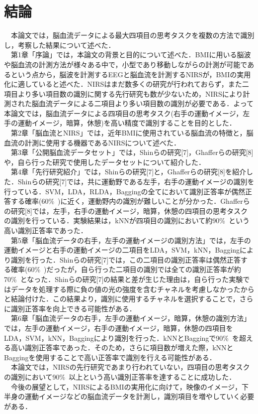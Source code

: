\documentclass[a4j,12pt]{jreport}
\begin{document}
\chapter{結論}
　本論文では，脳血流データによる最大四項目の思考タスクを複数の方法で識別し，考察した結果について述べた．\\
　第1章「序論」では，本論文の背景と目的について述べた．BMIに用いる脳波や脳血流の計測方法が様々ある中で，小型であり移動しながらの計測が可能であるという点から，脳波を計測するEEGと脳血流を計測するNIRSが，BMIの実用化に適していると述べた．NIRSはまだ数多くの研究が行われておらず，また二項目より多い項目数の識別に関する先行研究も数が少ないため，NIRSにより計測された脳血流データによる二項目より多い項目数の識別が必要である．よって本論文では，脳血流データによる四項目の思考タスク(右手の運動イメージ，左手の運動イメージ，暗算，休憩)を高い精度で識別することを目的とした．\\
　第2章「脳血流とNIRS」では，近年BMIに使用されている脳血流の特徴と，脳血流の計測に使用する機器であるNIRSについて述べた．\\
　第3章「公開脳血流データセット」では，Shinらの研究[7]，Ghafferらの研究[8]や，自ら行った研究で使用したデータセットについて紹介した．\\
　第4章「先行研究紹介」では，Shinらの研究[7]と，Ghafferらの研究[8]を紹介した．Shinらの研究[7]では，共に運動野である左手，右手の運動イメージの識別を行っている．SVM，LDA，RLDA，Baggingの全てにおいて識別正答率が偶然正答する確率(60\%\ )に近く，運動野内の識別が難しいことが分かった．Ghafferらの研究[8]では，左手，右手の運動イメージ，暗算，休憩の四項目の思考タスクの識別を行っている．実験結果は，kNNが四項目の識別において約90\%\ という高い識別正答率であった．\\
　第5章「脳血流データの右手，左手の運動イメージの識別方法」では，左手の運動イメージと右手の運動イメージの二項目をLDA，SVM，kNN，Baggingにより識別を行った．Shinらの研究[7]では，この二項目の識別正答率は偶然正答する確率(60\%\ )だったが，自ら行った二項目の識別では全ての識別正答率が約70\%\ となった．Shinらの研究[7]の結果と差が生じた理由は，自ら行った実験ではデータを処理する際に負の値の光の強度を含むチャネルを考慮しなかったからと結論付けた．この結果より，識別に使用するチャネルを選択することで，さらに識別正答率を向上できる可能性がある．\\
　第6章「脳血流データの右手，左手の運動イメージ，暗算，休憩の識別方法」では，左手の運動イメージ，右手の運動イメージ，暗算，休憩の四項目をLDA，SVM，kNN，Baggingにより識別を行った．kNNとBaggingで90\%\ を超える高い識別正答率であった．そのため，さらに項目数が増えた際，kNNとBaggingを使用することで高い正答率で識別を行える可能性がある．\\
　本論文では，NIRSの先行研究であまり行われていない，四項目の思考タスクの識別において90\%\ 以上という高い識別正答率を達することに成功した．\\
　今後の展望として，NIRSによるBMIの実用化に向けて，映像のイメージ，下半身の運動イメージなどの脳血流データを計測し，識別項目を増やしていく必要がある．\\
\end{document}
